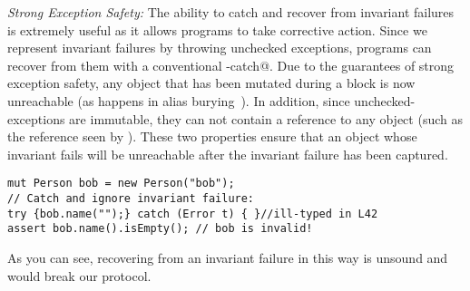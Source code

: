 \textit{Strong Exception Safety:}
The ability to catch and recover from invariant failures is extremely useful as it allows programs to take corrective action.
Since we represent invariant failures by throwing unchecked exceptions, programs can recover from them with a conventional \Q@try-catch@.
	Due to the guarantees of strong exception safety, any object that has been mutated during a \Q@try@ block is now unreachable (as happens in alias burying~\cite{boyland2001alias}). In addition, since unchecked-exceptions are immutable, they can not contain a \Q@read@ reference to any object (such as the \Q@this@ reference seen by \Q@invariant@). These two properties ensure that an object whose invariant fails will be unreachable after the invariant failure has been captured. %
\saveSpace
\begin{lstlisting}[morekeywords={assert}, escapechar=\%]
mut Person bob = new Person("bob");
// Catch and ignore invariant failure:
try {bob.name("");} catch (Error t) { }//ill-typed in L42
assert bob.name().isEmpty(); // bob is invalid!
\end{lstlisting}
\saveSpace
As you can see, recovering from an invariant failure in this way is unsound and would break our protocol.







